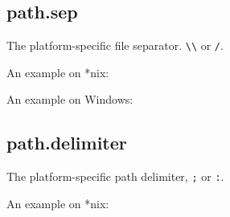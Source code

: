 \subsection{path.sep}\label{path.sep}

The platform-specific file separator.
\texttt{\textquotesingle{}\textbackslash{}\textbackslash{}\textquotesingle{}}
or \texttt{\textquotesingle{}/\textquotesingle{}}.

An example on *nix:

\begin{Shaded}
\begin{Highlighting}[]
\NormalTok{(}\NormalTok{)}
\NormalTok{[}\NormalTok{, }\NormalTok{, }\NormalTok{]}
\end{Highlighting}
\end{Shaded}

An example on Windows:

\begin{Shaded}
\begin{Highlighting}[]
\CharTok{\textbackslash{}\textbackslash{}}\CharTok{\textbackslash{}\textbackslash{}}\NormalTok{(}\NormalTok{)}
\NormalTok{[}\NormalTok{, }\NormalTok{, }\NormalTok{]}
\end{Highlighting}
\end{Shaded}

\subsection{path.delimiter}\label{path.delimiter}

The platform-specific path delimiter, \texttt{;} or
\texttt{\textquotesingle{}:\textquotesingle{}}.

An example on *nix:

\begin{Shaded}
\begin{Highlighting}[]
\NormalTok{(}\NormalTok{)}

\NormalTok{(}\NormalTok{)}
\NormalTok{[}\NormalTok{, }\NormalTok{, }\NormalTok{, }\NormalTok{, }\NormalTok{]}
\end{Highlighting}
\end{Shaded}

